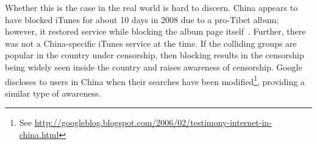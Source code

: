 Whether this is the case in the real world is hard to discern. China
appears to have blocked iTunes for about 10 days in 2008 due to a
pro-Tibet album; however, it restored service while blocking the album
page itself~\cite{china-itunes}. Further, there was not a China-specific
iTunes service at the time. If the colliding groups are popular in the
country under censorship, then blocking results in the censorship being
widely seen inside the country and raises awareness of
censorship. Google discloses to users in China when their searches have
been modified\footnote{See
  \url{http://googleblog.blogspot.com/2006/02/testimony-internet-in-china.html}},
providing a similar type of awareness.









